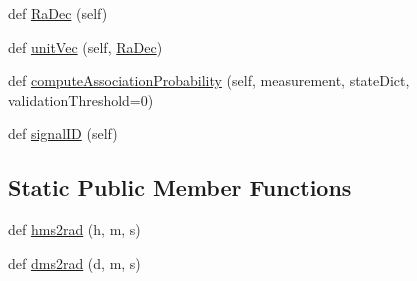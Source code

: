 \begin{DoxyCompactItemize}
\item 
def \hyperlink{classmodest_1_1signals_1_1pointsource_1_1PointSource_a295eb1a487e18c77029585ac2785db80}{Ra\+Dec} (self)
\item 
def \hyperlink{classmodest_1_1signals_1_1pointsource_1_1PointSource_aa51308fcb654e7183d332ed824965397}{unit\+Vec} (self, \hyperlink{classmodest_1_1signals_1_1pointsource_1_1PointSource_a295eb1a487e18c77029585ac2785db80}{Ra\+Dec})
\item 
def \hyperlink{classmodest_1_1signals_1_1pointsource_1_1PointSource_a8bdf640e312bbf3a56efd0e89d496361}{compute\+Association\+Probability} (self, measurement, state\+Dict, validation\+Threshold=0)
\item 
def \hyperlink{classmodest_1_1signals_1_1signalsource_1_1SignalSource_a9a64c6a9c2954f6ad61e4ca3518ea8ab}{signal\+ID} (self)
\end{DoxyCompactItemize}
\subsection*{Static Public Member Functions}
\begin{DoxyCompactItemize}
\item 
def \hyperlink{classmodest_1_1signals_1_1xraysource_1_1PeriodicXRaySource_ae9e07e0f728014ba3b6af0022d6367fe}{hms2rad} (h, m, s)
\item 
def \hyperlink{classmodest_1_1signals_1_1xraysource_1_1PeriodicXRaySource_a117b7c3ff21b26887d74fce01ffad0a8}{dms2rad} (d, m, s)
\end{DoxyCompactItemize}
